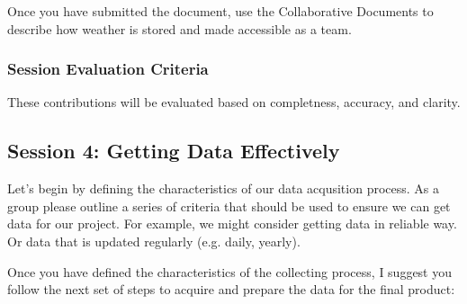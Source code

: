 \documentclass{article}\usepackage[]{graphicx}\usepackage[]{color}
\begin{document}
Once you have submitted the document, use the Collaborative Documents to describe how weather is stored and made accessible as a team. 

\subsubsection{Session Evaluation Criteria}

These contributions will be evaluated based on completness, accuracy, and clarity. 

\subsection{Session 4: Getting Data Effectively}

Let's begin by defining the characteristics of our data acqusition process. As a group please outline a series of criteria that should be used to ensure we can get data for our project. For example, we might consider getting data in reliable way. Or data that is updated regularly (e.g. daily, yearly).

Once you have defined the characteristics of the collecting process, I suggest you follow the next set of steps to acquire and prepare the data for the final product:
\end{document}
